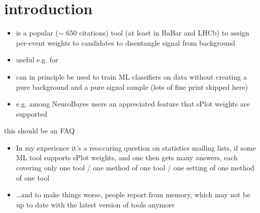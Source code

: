 \maketitle

\section{introduction}
\begin{frame}
  \begin{itemize}
    \item {} is a popular ($\sim$ 650 citations) tool (at least in BaBar and LHCb)
      to assign per-event weights to candidates to disentangle signal from background
    \item useful e.g. for 
    \item can in principle be used to train ML classifiers on data without creating a pure background and a pure signal sample
      \newline (lots of fine print skipped here)
      \item e.g. among NeuroBayes users an appreciated feature that sPlot weights are supported
  \end{itemize}
  \begin{block}{this should be an FAQ}
    \begin{itemize}
        \item In my experience it's a reoccuring question on statistics mailing lists, if some ML tool supports sPlot weights, and one then gets many answers, each covering only one tool / one method of one tool / one setting of one method of one tool
          \item \dots and to make things worse, people report from memory, which may not be up to date with the latest version of tools anymore
    \end{itemize}
  \end{block}

\end{frame}


